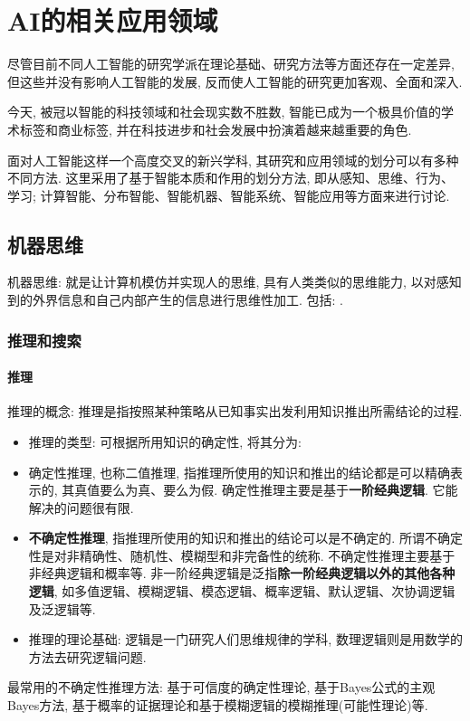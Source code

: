 \section{AI的相关应用领域}
尽管目前不同人工智能的研究学派在理论基础、研究方法等方面还存在一定差异, 但这些并没有影响人工智能的发展, 反而使人工智能的研究更加客观、全面和深入.

今天, 被冠以智能的科技领域和社会现实数不胜数, 智能已成为一个极具价值的学术标签和商业标签, 并在科技进步和社会发展中扮演着越来越重要的角色.

面对人工智能这样一个高度交叉的新兴学科, 其研究和应用领域的划分可以有多种不同方法. 这里采用了基于智能本质和作用的划分方法, 即从感知、思维、行为、学习; 计算智能、分布智能、智能机器、智能系统、智能应用等方面来进行讨论.
\subsection{机器思维}
机器思维: 就是让计算机模仿并实现人的思维, 具有人类类似的思维能力, 以对感知到的外界信息和自己内部产生的信息进行思维性加工.
     包括: .
\subsubsection{推理和搜索}
\paragraph{推理}

推理的概念: 推理是指按照某种策略从已知事实出发利用知识推出所需结论的过程.
\begin{itemize}
\item 推理的类型: 可根据所用知识的确定性, 将其分为:
\item 确定性推理, 也称二值推理, 指推理所使用的知识和推出的结论都是可以精确表示的, 其真值要么为真、要么为假. 确定性推理主要是基于\textbf{一阶经典逻辑}. 它能解决的问题很有限.
\item \textbf{不确定性推理}, 指推理所使用的知识和推出的结论可以是不确定的. 所谓不确定性是对非精确性、随机性、模糊型和非完备性的统称. 不确定性推理主要基于非经典逻辑和概率等. 非一阶经典逻辑是泛指\textbf{除一阶经典逻辑以外的其他各种逻辑}, 如多值逻辑、模糊逻辑、模态逻辑、概率逻辑、默认逻辑、次协调逻辑及泛逻辑等.
\item 推理的理论基础: 逻辑是一门研究人们思维规律的学科, 数理逻辑则是用数学的方法去研究逻辑问题.
\end{itemize}
最常用的不确定性推理方法: 基于可信度的确定性理论, 基于Bayes公式的主观Bayes方法, 基于概率的证据理论和基于模糊逻辑的模糊推理(可能性理论)等.

